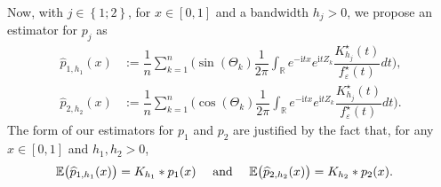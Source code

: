 \documentclass[11pt,a4paper,openany]{article}
\def\R{\mathbb{R}}
\def\E{\mathbb{E}}
\begin{document}
Now, with $j \in \left\{ 1 ; 2 \right\}$, for $x \in [0, 1]$ and a bandwidth  $h_{j} > 0$, we propose an estimator for $p_{j}$ as   
\begin{align}
\widehat{p}_{1 , h_{1}}(x) &:=  \dfrac{1}{n}  \displaystyle{ \sum_{k = 1}^{n} }  \Big(  \sin(\Theta_k) \dfrac{1}{2\pi} \int_{\R}  e^{-\mathrm{i}tx} e^{\mathrm{i} t Z_{k}} \dfrac{ K_{h_{j}}^\star(t) }{ f^{\star}_\varepsilon(t) } dt \Big) , \\
\widehat{p}_{2 , h_{2}}(x) &:=  \dfrac{1}{n}  \displaystyle{ \sum_{k = 1}^{n} }  \Big(  \cos(\Theta_k) \dfrac{1}{2\pi} \int_{\R}  e^{-\mathrm{i} tx} e^{\mathrm{i} t Z_{k}} \dfrac{ K_{h_{j}}^\star(t) }{ f^{\star}_\varepsilon(t) } dt \Big).
 \label{formula:estimate.p1-p2.fixed-h}
\end{align}
The form of our estimators for $p_1$ and $p_{2}$ are justified by the fact that, for any $x \in [0,1]$  and $h_{1}, h_{2} > 0$, \begin{align}
\E \big( \widehat{p}_{1,h_{1}}(x) \big) &= %
K_{h_{1}} \ast p_{1}(x)   \quad   \textrm{  and  }  \quad  \E \big(  \widehat{p}_{2,h_{2}}(x) \big) = K_{h_{2}} \ast p_{2}(x).    
\label{form:compute.expetation.p_{1,h1}.p_{2,h2}}
\end{align}   
\end{document}
